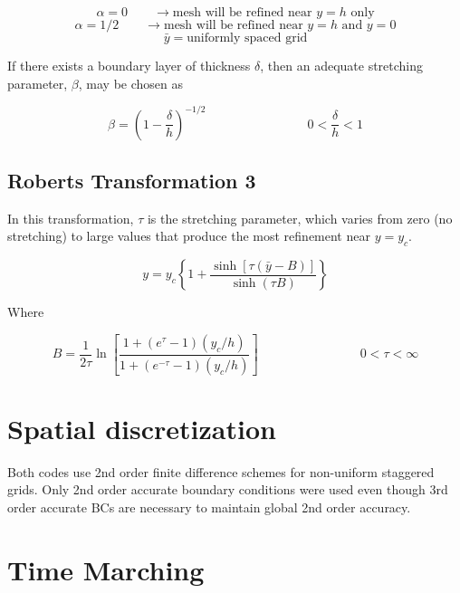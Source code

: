 \documentclass[11pt]{article}
\begin{document}
\begin{equation}
	\alpha = 0 \qquad \rightarrow \text{mesh will be refined near $y=h$ only}
\end{equation}
\begin{equation}
	\alpha = 1/2 \qquad \rightarrow \text{mesh will be refined near $y=h$ and $y=0$}
\end{equation}
\begin{equation}
	\bar{y} = \text{uniformly spaced grid}
\end{equation}

If there exists a boundary layer of thickness $\delta$, then an adequate stretching parameter, $\beta$, may be chosen as

\begin{equation}
	\beta = \left( 1 - \frac{\delta}{h} \right)^{-1/2}
	\qquad \qquad
	\qquad \qquad
	0 < \frac{\delta}{h} < 1
\end{equation}


\subsection{Roberts Transformation 3}
In this transformation, $\tau$ is the stretching parameter, which varies from zero (no stretching) to large values that produce the most refinement near $y=y_c$.

\begin{equation}
	y
	=
	y_c
	\left\{
	1
	+
	\frac{\sinh[\tau (\bar{y}-B)]}
	{\sinh(\tau B)}
	\right\}
\end{equation}

Where

\begin{equation}
	B
	=
	\frac{1}{2\tau}
	\ln
	\left[
	\frac{1+(e^\tau-1) (y_c/h)}{1+(e^{-\tau}-1) (y_c/h)}
	\right]
	\qquad \qquad \qquad \qquad
	0 <\tau < \infty
\end{equation}


\section{Spatial discretization}
Both codes use 2nd order finite difference schemes for non-uniform staggered grids. Only 2nd order accurate boundary conditions were used even though 3rd order accurate BCs are necessary to maintain global 2nd order accuracy.

\section{Time Marching}
\end{document}
